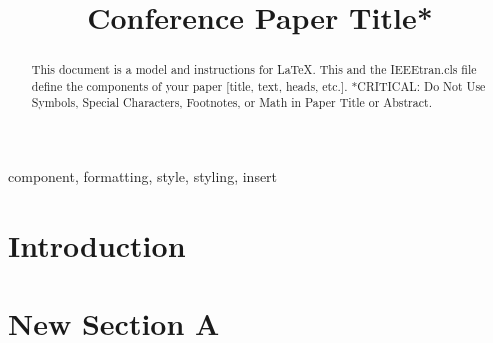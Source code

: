 \documentclass[conference]{IEEEtran}
\begin{document}
\title{Conference Paper Title*\\
}

\author{
    \and
    \and
}

\maketitle

\begin{abstract}
    This document is a model and instructions for \LaTeX.
    This and the IEEEtran.cls file define the components of your paper [title, text, heads, etc.]. *CRITICAL: Do Not Use Symbols, Special Characters, Footnotes,
    or Math in Paper Title or Abstract.
\end{abstract}

\begin{IEEEkeywords}
    component, formatting, style, styling, insert
\end{IEEEkeywords}

\section{Introduction}
\lipsum[1]

\section{New Section A}
\end{document}
